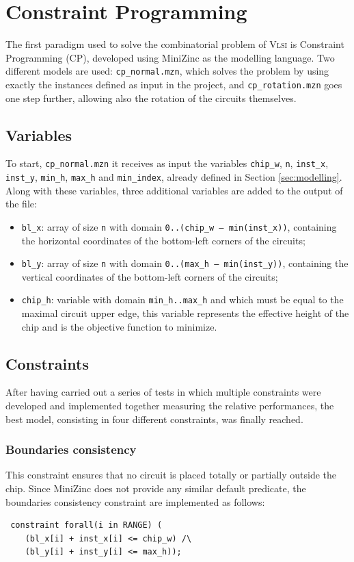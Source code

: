 \documentclass[a4paper, 12pt]{article}
\begin{document}
\section{Constraint Programming}
The first paradigm used to solve the combinatorial problem of \textsc{Vlsi} is Constraint Programming (CP), developed using MiniZinc as the modelling language. Two different models are used: \verb|cp_normal.mzn|, which solves the problem by using exactly the instances defined as input in the project, and \verb|cp_rotation.mzn| goes one step further, allowing also the rotation of the circuits themselves.

\subsection{Variables}
To start, \verb|cp_normal.mzn| it receives as input the variables \verb|chip_w|, \verb|n|, \verb|inst_x|, \verb|inst_y|, \verb|min_h|, \verb|max_h| and \verb|min_index|, already defined in Section \ref{sec:modelling}. Along with these variables, three additional variables are added to the output of the file:
\begin{itemize}
	\item \verb|bl_x|: array of size \verb|n| with domain \verb|0..(chip_w – min(inst_x))|, containing the horizontal coordinates of the bottom-left corners of the circuits;
	\item \verb|bl_y|: array of size \verb|n| with domain \verb|0..(max_h – min(inst_y))|, containing the vertical coordinates of the bottom-left corners of the circuits;
	\item \verb|chip_h|: variable with domain \verb|min_h..max_h| and which must be equal to the maximal circuit upper edge, this variable represents the effective height of the chip and is the objective function to minimize. 
\end{itemize}

\subsection{Constraints}
After having carried out a series of tests in which multiple constraints were developed and implemented together measuring the relative performances, the best model, consisting in four different constraints, was finally reached.


\subsubsection{Boundaries consistency}
This constraint ensures that no circuit is placed totally or partially outside the chip. Since MiniZinc does not provide any similar default predicate, the boundaries consistency constraint are implemented as follows:
\begin{verbatim}
 constraint forall(i in RANGE) (
    (bl_x[i] + inst_x[i] <= chip_w) /\
    (bl_y[i] + inst_y[i] <= max_h));
 \end{verbatim}
 
\end{document}
